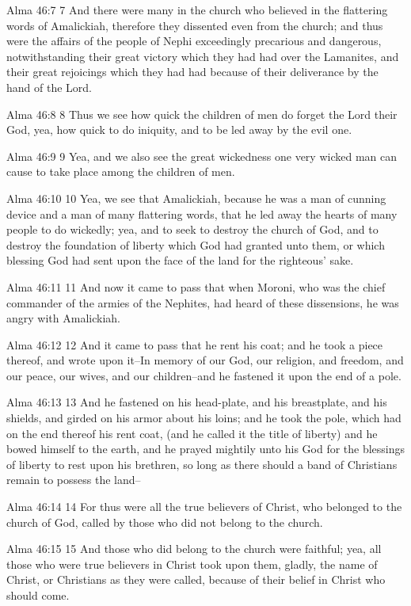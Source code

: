 Alma 46:7
 7 And there were many in the church who believed in the
flattering words of Amalickiah, therefore they dissented even
from the church; and thus were the affairs of the people of Nephi
exceedingly precarious and dangerous, notwithstanding their great
victory which they had had over the Lamanites, and their great
rejoicings which they had had because of their deliverance by the
hand of the Lord.

Alma 46:8
 8 Thus we see how quick the children of men do forget the Lord
their God, yea, how quick to do iniquity, and to be led away by
the evil one.

Alma 46:9
 9 Yea, and we also see the great wickedness one very wicked man
can cause to take place among the children of men.

Alma 46:10
 10 Yea, we see that Amalickiah, because he was a man of cunning
device and a man of many flattering words, that he led away the
hearts of many people to do wickedly; yea, and to seek to destroy
the church of God, and to destroy the foundation of liberty which
God had granted unto them, or which blessing God had sent upon
the face of the land for the righteous' sake.

Alma 46:11
 11 And now it came to pass that when Moroni, who was the chief
commander of the armies of the Nephites, had heard of these
dissensions, he was angry with Amalickiah.

Alma 46:12
 12 And it came to pass that he rent his coat; and he took a
piece thereof, and wrote upon it--In memory of our God, our
religion, and freedom, and our peace, our wives, and our
children--and he fastened it upon the end of a pole.

Alma 46:13
 13 And he fastened on his head-plate, and his breastplate, and
his shields, and girded on his armor about his loins; and he took
the pole, which had on the end thereof his rent coat, (and he
called it the title of liberty) and he bowed himself to the
earth, and he prayed mightily unto his God for the blessings of
liberty to rest upon his brethren, so long as there should a band
of Christians remain to possess the land--

Alma 46:14
 14 For thus were all the true believers of Christ, who belonged
to the church of God, called by those who did not belong to the
church.

Alma 46:15
 15 And those who did belong to the church were faithful; yea,
all those who were true believers in Christ took upon them,
gladly, the name of Christ, or Christians as they were called,
because of their belief in Christ who should come.

